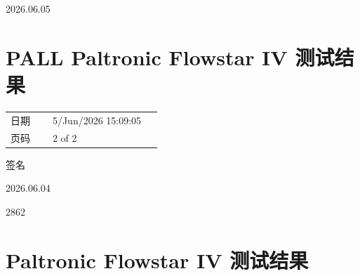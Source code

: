 \documentclass[UTF8,10pt,a4paper,fontset=fandol]{ctexart}
\newcommand{\fieldvalue}[1]{#1}
\newcommand{\handwritten}[1]{#1}
\begin{document}
\fieldvalue{\handwritten{2026.06.05}}

\vspace{1em}

\section*{PALL Paltronic Flowstar IV 测试结果}

\begin{tabular}{@{}p{0.25\linewidth}p{0.65\linewidth}@{}}
日期 &
\fieldvalue{5/Jun/2026 15:09:05}
\\[2pt]
页码 &
\fieldvalue{2 of 2}
\end{tabular}

\vspace{1em}

\begin{center}
\end{center}

\vspace{1em}

\fieldvalue{\handwritten{签名}}

\fieldvalue{\handwritten{2026.06.04}}

\fieldvalue{\handwritten{2862}}

\newpage

\section{Paltronic Flowstar IV 测试结果}
\end{document}
